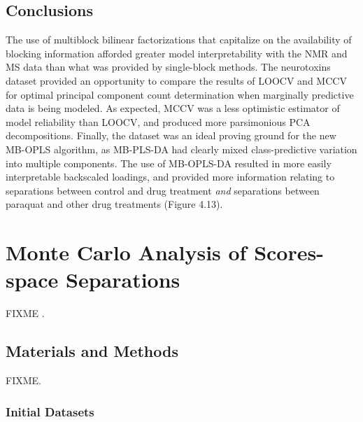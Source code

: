 \subsection{Conclusions}

\begin{doublespace}
The use of multiblock bilinear factorizations that capitalize on the
availability of blocking information afforded greater model interpretability
with the NMR and MS data than what was provided by single-block methods. The
neurotoxins dataset provided an opportunity to compare the results of LOOCV
and MCCV for optimal principal component count determination when marginally
predictive data is being modeled. As expected, MCCV was a less optimistic
estimator of model reliability than LOOCV, and produced more parsimonious PCA
decompositions. Finally, the dataset was an ideal proving ground for the new
MB-OPLS algorithm, as MB-PLS-DA had clearly mixed class-predictive variation
into multiple components. The use of MB-OPLS-DA resulted in more easily
interpretable backscaled loadings, and provided more information relating to
separations between control and drug treatment \emph{and} separations between
paraquat and other drug treatments (Figure 4.13).
\end{doublespace}

\section{Monte Carlo Analysis of Scores-space Separations}

\begin{doublespace}
FIXME \cite{worley:anchem2015}.
\end{doublespace}

\subsection{Materials and Methods}

\begin{doublespace}
FIXME.
\end{doublespace}

\subsubsection{Initial Datasets}

